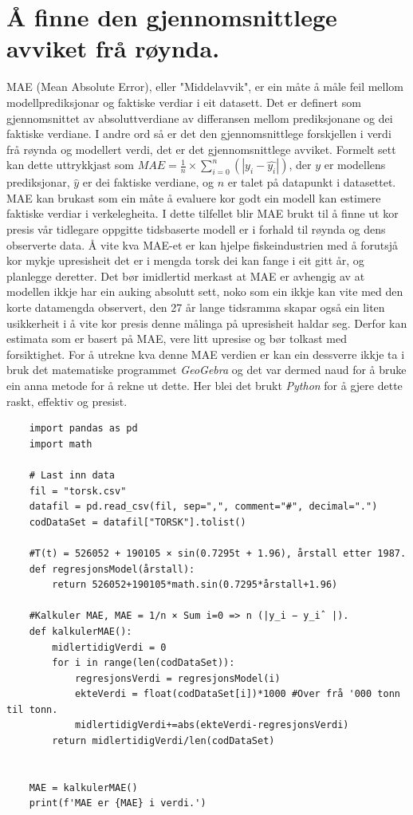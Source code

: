 \documentclass{report}
\begin{document}
\section{Å finne den gjennomsnittlege avviket frå røynda.}
MAE (Mean Absolute Error), eller "Middelavvik", er ein måte å måle feil mellom modellprediksjonar og faktiske verdiar i eit datasett.
Det er definert som gjennomsnittet av absoluttverdiane av differansen mellom prediksjonane og dei faktiske verdiane.
I andre ord så er det den gjennomsnittlege forskjellen i verdi frå røynda og modellert verdi, det er det gjennomsnittlege avviket.
Formelt sett kan dette uttrykkjast som $MAE = \frac{1}{n}\times \sum_{i=0}^{n}(|y_i - \hat{y_i}|)$, der $y$ er modellens prediksjonar, $\hat{y}$ er dei faktiske verdiane, og $n$ er talet på datapunkt i datasettet.
MAE kan brukast som ein måte å evaluere kor godt ein modell kan estimere faktiske verdiar i verkelegheita.
I dette tilfellet blir MAE brukt til å finne ut kor presis vår tidlegare oppgitte tidsbaserte modell er i forhald til røynda og dens observerte data.
Å vite kva MAE-et er kan hjelpe fiskeindustrien med å forutsjå kor mykje upresisheit det er i mengda torsk dei kan fange i eit gitt år, og planlegge deretter.
Det bør imidlertid merkast at MAE er avhengig av at modellen ikkje har ein auking absolutt sett, noko som ein ikkje kan vite med den korte datamengda observert, den 27 år lange tidsramma skapar også ein liten usikkerheit i å vite kor presis denne målinga på upresisheit haldar seg.
Derfor kan estimata som er basert på MAE, vere litt upresise og bør tolkast med forsiktighet.
For å utrekne kva denne MAE verdien er kan ein dessverre ikkje ta i bruk det matematiske programmet \textit{GeoGebra} og det var dermed naud for å bruke ein anna metode for å rekne ut dette.
Her blei det brukt \textit{Python} for å gjere dette raskt, effektiv og presist.
\begin{verbatim}
    import pandas as pd
    import math

    # Last inn data
    fil = "torsk.csv"
    datafil = pd.read_csv(fil, sep=",", comment="#", decimal=".")
    codDataSet = datafil["TORSK"].tolist()

    #T(t) = 526052 + 190105 × sin(0.7295t + 1.96), årstall etter 1987.
    def regresjonsModel(årstall):
        return 526052+190105*math.sin(0.7295*årstall+1.96)

    #Kalkuler MAE, MAE = 1/n × Sum i=0 => n (|y_i − y_iˆ |).
    def kalkulerMAE():
        midlertidigVerdi = 0
        for i in range(len(codDataSet)):
            regresjonsVerdi = regresjonsModel(i)
            ekteVerdi = float(codDataSet[i])*1000 #Over frå '000 tonn til tonn.
            midlertidigVerdi+=abs(ekteVerdi-regresjonsVerdi)
        return midlertidigVerdi/len(codDataSet)


    MAE = kalkulerMAE()
    print(f'MAE er {MAE} i verdi.')
\end{verbatim}
\end{document}
